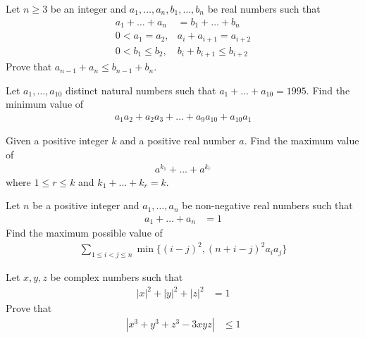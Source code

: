 \documentclass{subfile}
\begin{document}
		\begin{problem}[$1995$, problem $1$]
			Let $n\geq3$ be an integer and $a_{1},\ldots,a_{n},b_{1},\ldots,b_{n}$ be real numbers such that
				\begin{align*}
					a_{1}+\ldots+a_{n}
						& = b_{1}+\ldots+b_{n}\\
					0<a_{1}=a_{2},
						& a_{i}+a_{i+1}=a_{i+2}\\
					0<b_{1}\leq b_{2},
						& b_{i}+b_{i+1}\leq b_{i+2}
				\end{align*}
			Prove that $a_{n-1}+a_{n}\leq b_{n-1}+b_{n}$.
		\end{problem}
	
		\begin{problem}[$1995$, problem $5$]
			Let $a_{1},\ldots,a_{10}$ distinct natural numbers such that $a_{1}+\ldots+a_{10}=1995$. Find the minimum value of
				\begin{align*}
					a_{1}a_{2}+a_{2}a_{3}+\ldots+a_{9}a_{10}+a_{10}a_{1}
				\end{align*}
		\end{problem}
	
		\begin{problem}[$1993$, problem $2$]
			Given a positive integer $k$ and a positive real number $a$. Find the maximum value of
				\begin{align*}
					a^{k_1}+\ldots+a^{k_r}
				\end{align*}
			where $1\leq r\leq k$ and $k_{1}+\ldots+k_{r}=k$.
		\end{problem}
	
		\begin{problem}
			Let $n$ be a positive integer and $a_{1},\ldots,a_{n}$ be non-negative real numbers such that
				\begin{align*}
					a_{1}+\ldots+a_{n}
						& = 1
				\end{align*}
			Find the maximum possible value of
				\begin{align*}
					\sum_{1\leq i<j\leq n}\min\{(i-j)^{2},(n+i-j)^{2}a_{i}a_{j}\}
				\end{align*}
		\end{problem}
	
		\begin{problem}
			Let $x,y,z$ be complex numbers such that
				\begin{align*}
					|x|^{2}+|y|^{2}+|z|^{2}
						& = 1
				\end{align*}
			Prove that
				\begin{align*}
					\left|x^{3}+y^{3}+z^{3}-3xyz\right|
						& \leq1
				\end{align*}
		\end{problem}
	
\end{document}
